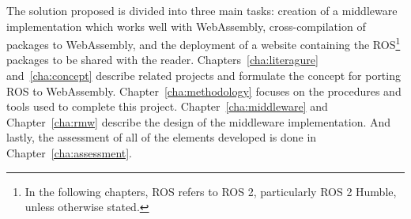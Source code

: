 The solution proposed is divided into three main tasks: creation of a middleware implementation which works well with WebAssembly, cross-compilation of packages to WebAssembly, and the deployment of a website containing the \ac{ROS}\footnote{In the following chapters, \ac{ROS} refers to \ac{ROS} 2, particularly \ac{ROS} 2 Humble, unless otherwise stated.} packages to be shared with the reader. Chapters~\ref{cha:literagure} and~\ref{cha:concept} describe related projects and formulate the concept for porting \ac{ROS} to WebAssembly. Chapter~\ref{cha:methodology} focuses on the procedures and tools used to complete this project. Chapter~\ref{cha:middleware} and Chapter~\ref{cha:rmw} describe the design of the middleware implementation. And lastly, the assessment of all of the elements developed is done in Chapter~\ref{cha:assessment}.